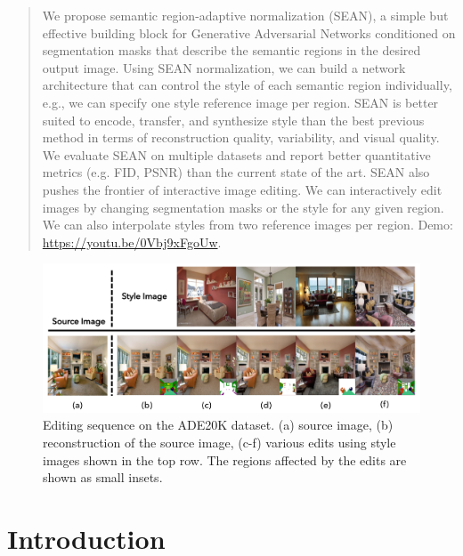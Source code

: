\documentclass[10pt,twocolumn,letterpaper]{article}
\begin{document}
\begin{abstract}
    We propose semantic region-adaptive normalization (SEAN), a simple but effective building block for Generative Adversarial Networks conditioned on segmentation masks that describe the semantic regions in the desired output image.
    Using SEAN normalization, we can build a network architecture that can control the style of each semantic region individually, e.g., we can specify one style reference image per region. SEAN is better suited to encode, transfer, and synthesize style than the best previous method in terms of reconstruction quality, variability, and visual quality.
    We evaluate SEAN on multiple datasets and report better quantitative metrics (e.g. FID, PSNR) than the current state of the art.
    SEAN also pushes the frontier of interactive image editing. We can interactively edit images by changing segmentation masks or the style for any given region. We can also interpolate styles from two reference images per region. Demo:  \small{\url{https://youtu.be/0Vbj9xFgoUw}}.
\end{abstract}


\begin{figure}[th]
\centering
\includegraphics[width=\linewidth]{Figures/ADE_editing2.pdf}
\vspace*{-7mm}
\caption{Editing sequence on the ADE20K dataset. (a) source image, (b) reconstruction of the source image, (c-f) various edits using style images shown in the top row. The regions affected by the edits are shown as small insets.}
\label{fig:ADE editing}
\end{figure}


\section{Introduction}
\end{document}

